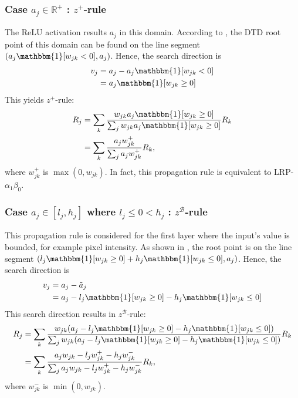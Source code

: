 \subsubsection{Case $a_j \in \mathbb{R}^+$ : $z^+$-rule}

The ReLU activation results $a_j$ in this domain. According to \addfigure{\ref{fig:dtd_zplus}}, the DTD root point of this domain can be found on the line segment  $( a_j \mathbbm{1}[ w_{jk}  < 0 ], a_j )$. Hence, the search direction is 
\begin{align*}
	v_j &= a_j - a_j \mathbbm{1}[ w_{jk}  < 0 ] \\
	&= a_j \mathbbm{1}[ w_{jk}  \ge 0 ]
\end{align*}
This yields $z^+$-rule:
\begin{align*}
		R_j &=	\sum_k \frac{ w_{jk} a_j \mathbbm{1}[w_{jk}  \ge 0 ]  }{\sum_{j} w_{jk} a_j \mathbbm{1}[ w_{jk}  \ge 0 ]}  R_k\\
		&=	\sum_k  \frac{ a_j  w_{jk}^+   }{\sum_{j}  a_j w_{jk}^+  }R_k,
\end{align*}
where $w_{jk}^+$ is $\max(0, w_{jk})$. In fact, this propagation rule is equivalent to LRP-$\alpha_1\beta_0$. 


\subsubsection{Case $a_j \in [l_j , h_j]$ where $l_j \le 0 < h_j $ : $z^\mathcal{B}$-rule}

This propagation rule is considered for the first layer where the input's value is bounded, for example pixel intensity. As shown in \addfigure{\ref{fig:dtd_zbeta}}, the root point is on the line segment $( l_j \mathbbm{1}[ w_{jk}  \ge 0 ]  + h_j \mathbbm{1}[ w_{jk}  \le 0 ]  , a_j ) $. Hence,  the search direction is 
\begin{align*}
	v_j &= a_j - \tilde{a}_j \\
	&=a_j  - l_j \mathbbm{1}[ w_{jk}  \ge 0 ]  - h_j \mathbbm{1}[ w_{jk}  \le 0 ]
\end{align*}
This search direction results in  $z^\mathcal{B}$-rule:
\begin{align*}
		R_j &=	\sum_k \frac{ w_{jk}  (a_j  - l_j \mathbbm{1}[ w_{jk}  \ge 0 ]  - h_j \mathbbm{1}[ w_{jk}  \le 0 ]) }{\sum_{j} w_{jk}  (a_j  - l_j \mathbbm{1}[ w_{jk}  \ge 0 ] - h_j \mathbbm{1}[ w_{jk}  \le 0 ]) }  R_k\\
		&=	\sum_k  \frac{ a_j  w_{jk} - l_j w_{jk}^+ - h_j w_{jk}^-  }{\sum_{j}   a_j  w_{jk} - l_j w_{jk}^+ - h_j w_{jk}^- }  R_k,
\end{align*}
where $w_{jk}^-$ is $\min(0, w_{jk})$.


